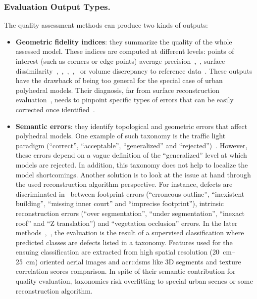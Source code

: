 \documentclass[runningheads]{llncs}
\begin{document}
\subsubsection{Evaluation Output Types.}
The quality assessment methods can produce two kinds of outputs:
\begin{itemize}
    \item \textbf{Geometric fidelity indices}: they summarize the quality of the whole assessed model. These indices are computed at different levels: points of interest (such as corners or edge points) average precision~\cite{Kaartinen2005},~\cite{Voegtle2003}, surface dissimilarity~\cite{Kaartinen2005},~\cite{Henricsson1997},~\cite{Zeng2014},~\cite{Lafarge2012},~\cite{li2016boxfitting} or volume discrepancy to reference data~\cite{Zeng2014}. These outputs have the drawback of being too general for the special case of urban polyhedral models. Their diagnosis, far from surface reconstruction evaluation~\cite{berger2013benchmark}, needs to pinpoint specific types of errors that can be easily corrected once identified~\cite{OudeElberink2010}.
    \item \textbf{Semantic errors}: they identify topological and geometric errors that affect polyhedral models. One example of such taxonomy is the traffic light paradigm (``correct'', ``acceptable'', ``generalized'' and ``rejected'')~\cite{boudet2006supervised}. However, these errors depend on a vague definition of the ``generalized'' level at which models are rejected. In addition, this taxonomy does not help to localize the model shortcomings. Another solution is to look at the issue at hand through the used reconstruction algorithm perspective. For instance, defects are discriminated in~\cite{Michelin2013} between footprint errors (``erroneous outline'', ``inexistent building'', ``missing inner court'' and ``imprecise footprint''), intrinsic reconstruction errors (``over segmentation'', ``under segmentation'', ``inexact roof'' and ``Z translation'') and ``vegetation occlusion'' errors. In the later methods~\cite{boudet2006supervised},~\cite{Michelin2013}, the evaluation is the result of a supervised classification where predicted classes are defects listed in a taxonomy. Features used for the ensuing classification are extracted from high spatial resolution (\SIrange{20}{25}{\cm}) oriented aerial images and \glspl{acr::dsm} like 3D segments and texture correlation scores comparison. In spite of their semantic contribution for quality evaluation, taxonomies risk overfitting to special urban scenes or some reconstruction algorithm.
\end{itemize}
\end{document}
